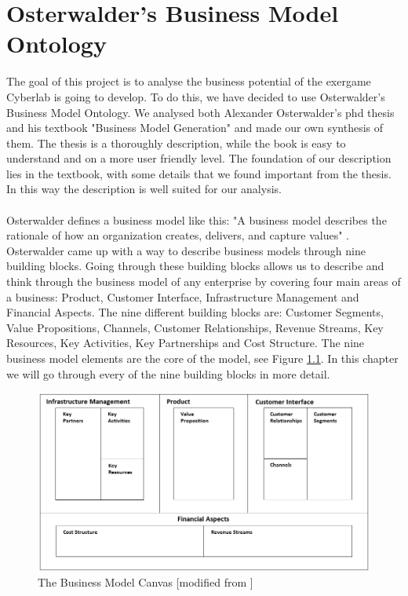 \chapter{Osterwalder's Business Model Ontology}
The goal of this project is to analyse the business potential of the exergame Cyberlab is going to develop. To do this, we have decided to use Osterwalder's Business Model Ontology. We analysed both Alexander Osterwalder's phd thesis \cite{osterwalderthesis} and his textbook "Business Model Generation" \cite{osterwalder} and made our own synthesis of them. The thesis is a thoroughly description, while the book is easy to understand and on a more user friendly level. The foundation of our description lies in the textbook, with some details that we found important from the thesis. In this way the description is well suited for our analysis.\\ \\
Osterwalder defines a business model like this: "A business model describes the rationale of how an organization creates, delivers, and capture values" \cite{osterwalder}. Osterwalder came up with a way to describe business models through nine building blocks. Going through these building blocks allows us to describe and think through the business model of any enterprise by covering four main areas of a business:  Product, Customer Interface, Infrastructure Management and Financial Aspects. The nine different building blocks are: Customer Segments, Value Propositions, Channels, Customer Relationships, Revenue Streams, Key Resources, Key Activities, Key Partnerships and Cost Structure. The nine business model elements are the core of the model, see Figure \ref{fig:TheBusinessModelCanvas}. In this chapter we will go through every of the nine building blocks in more detail. \cite{osterwalder}

\begin{figure}
\label{fig:TheBusinessModelCanvas}
\begin{center}
\includegraphics[angle=90, scale=0.7]{osterwaldersbmmodified}
\caption[The Business Model Canvas]{The Business Model Canvas [modified from \cite{osterwalder}]}
\end{center}
\end{figure}

